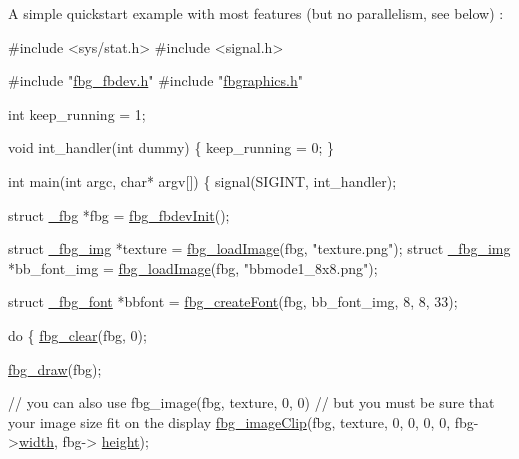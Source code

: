 A simple quickstart example with most features (but no parallelism, see below) \+:


\begin{DoxyCode}
\textcolor{preprocessor}{#include <sys/stat.h>}
\textcolor{preprocessor}{#include <signal.h>}

\textcolor{preprocessor}{#include "\hyperlink{fbg__fbdev_8h}{fbg\_fbdev.h}"}
\textcolor{preprocessor}{#include "\hyperlink{fbgraphics_8h}{fbgraphics.h}"}

\textcolor{keywordtype}{int} keep\_running = 1;

\textcolor{keywordtype}{void} int\_handler(\textcolor{keywordtype}{int} dummy) \{
    keep\_running = 0;
\}

\textcolor{keywordtype}{int} main(\textcolor{keywordtype}{int} argc, \textcolor{keywordtype}{char}* argv[]) \{
    signal(SIGINT, int\_handler);

    \textcolor{keyword}{struct }\hyperlink{struct__fbg}{\_fbg} *fbg = \hyperlink{fbg__fbdev_8h_a8ebf35a2c6451e36bd33e3e985f418dc}{fbg\_fbdevInit}();

    \textcolor{keyword}{struct }\hyperlink{fbgraphics_8h_struct__fbg__img}{\_fbg\_img} *texture = \hyperlink{fbgraphics_8h_a731ce4c5439d16555aa6ec48751ecea6}{fbg\_loadImage}(fbg, \textcolor{stringliteral}{"texture.png"});
    \textcolor{keyword}{struct }\hyperlink{fbgraphics_8h_struct__fbg__img}{\_fbg\_img} *bb\_font\_img = \hyperlink{fbgraphics_8h_a731ce4c5439d16555aa6ec48751ecea6}{fbg\_loadImage}(fbg, \textcolor{stringliteral}{"bbmode1\_8x8.png"});

    \textcolor{keyword}{struct }\hyperlink{fbgraphics_8h_struct__fbg__font}{\_fbg\_font} *bbfont = \hyperlink{fbgraphics_8h_afdcb72ae08437471569c4880fb43f20c}{fbg\_createFont}(fbg, bb\_font\_img, 8, 8, 33);

    \textcolor{keywordflow}{do} \{
        \hyperlink{fbgraphics_8h_aab50cccf3eceac81bda220a0c09e38e0}{fbg\_clear}(fbg, 0);

        \hyperlink{fbgraphics_8h_a2dfb2f17bc31e161868e6baf1c391816}{fbg\_draw}(fbg);

        \textcolor{comment}{// you can also use fbg\_image(fbg, texture, 0, 0)}
        \textcolor{comment}{// but you must be sure that your image size fit on the display}
        \hyperlink{fbgraphics_8h_a3610bf730319af99045283ea66955741}{fbg\_imageClip}(fbg, texture, 0, 0, 0, 0, fbg->\hyperlink{struct__fbg_a1d3c76643e4ee424f4d17e27991d5e2e}{width}, fbg->
      \hyperlink{struct__fbg_a3a3bd409e71d020fa77f69a541d832f8}{height});


\end{DoxyCode}

